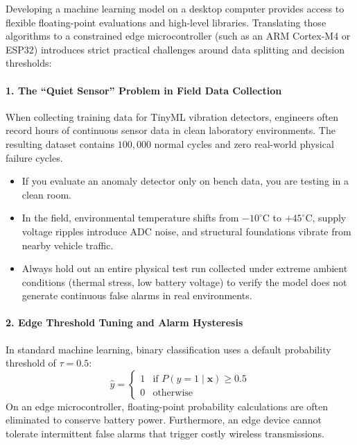 \begin{iotbox}
Developing a machine learning model on a desktop computer provides access to flexible floating-point evaluations and high-level libraries. Translating those algorithms to a constrained edge microcontroller (such as an ARM Cortex-M4 or ESP32) introduces strict practical challenges around data splitting and decision thresholds:

\paragraph{1. The ``Quiet Sensor'' Problem in Field Data Collection}
When collecting training data for TinyML vibration detectors, engineers often record hours of continuous sensor data in clean laboratory environments. The resulting dataset contains $100{,}000$ normal cycles and zero real-world physical failure cycles. 
\begin{itemize}
    \item If you evaluate an anomaly detector only on bench data, you are testing in a clean room.
    \item In the field, environmental temperature shifts from $-10^\circ\text{C}$ to $+45^\circ\text{C}$, supply voltage ripples introduce ADC noise, and structural foundations vibrate from nearby vehicle traffic.
    \item Always hold out an entire physical test run collected under extreme ambient conditions (thermal stress, low battery voltage) to verify the model does not generate continuous false alarms in real environments.
\end{itemize}

\paragraph{2. Edge Threshold Tuning and Alarm Hysteresis}
In standard machine learning, binary classification uses a default probability threshold of $\tau = 0.5$:
\begin{equation}
\hat{y} = \begin{cases} 1 & \text{if } P(y=1 \mid \mathbf{x}) \ge 0.5 \\ 0 & \text{otherwise} \end{cases}
\end{equation}
On an edge microcontroller, floating-point probability calculations are often eliminated to conserve battery power. Furthermore, an edge device cannot tolerate intermittent false alarms that trigger costly wireless transmissions.


\end{iotbox}
